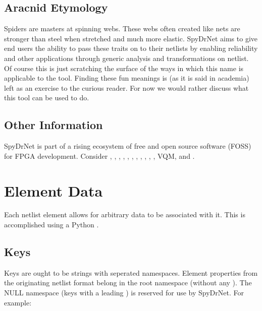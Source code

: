 \documentclass[letterpaper,10pt,english,openany,oneside]{sphinxmanual}
\begin{document}
\section{Aracnid Etymology}
\label{\detokenize{reference/introduction:aracnid-etymology}}
Spiders are masters at spinning webs. These webs often created like nets are stronger than steel when stretched and much more elastic. SpyDrNet aims to give end users the ability to pass these traits on to their netlists by enabling reliability and other applications through generic analysis and transformations on netlist. Of course this is just scratching the surface of the ways in which this name is applicable to the tool. Finding these fun meanings is (as it is said in academia) left as an exercise to the curious reader. For now we would rather discuss what this tool can be used to do.


\section{Other Information}
\label{\detokenize{reference/introduction:other-information}}
SpyDrNet is part of a rising ecosystem of free and open source software (FOSS) for FPGA development. Consider , , , , , , , , , , , VQM, and .


\chapter{Element Data}
\label{\detokenize{reference/element_data:element-data}}\label{\detokenize{reference/element_data:sec-element-data}}\label{\detokenize{reference/element_data::doc}}
Each netlist element allows for arbitrary data to be associated with it. This is accomplished using a Python .


\section{Keys}
\label{\detokenize{reference/element_data:keys}}
Keys are ought to be strings with  seperated namespaces. Element properties from the originating netlist format
belong in the root namespace (without any ). The NULL namespace (keys with a leading ) is reserved for use by
SpyDrNet. For example:
\end{document}
